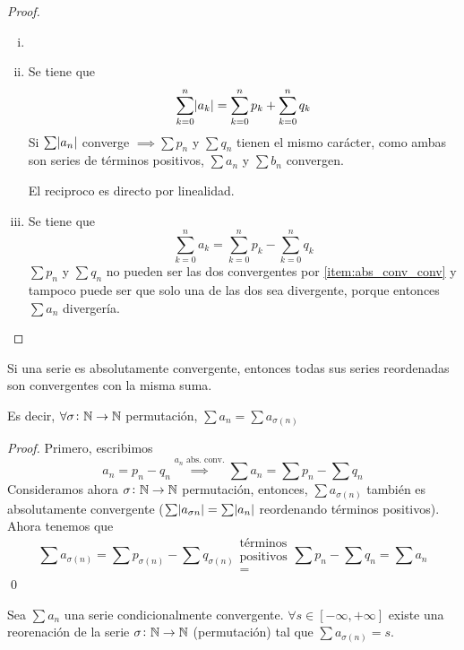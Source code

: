\begin{proof}
  \begin{enumerate}[i)]
  	\item[]
  	\item Se tiene que
			\[
				\sum\limits_{k=0}^ n \abs{a_k} = \sum\limits_{k=0}^ n p_k + \sum\limits_{k=0}^n q_k
    	\]
    	Si $\sum \abs{a_n}$ converge $\implies \sum p_n$ y $\sum q_n$ tienen el mismo carácter,
			como ambas son series de términos positivos, $\sum a_n$ y $\sum b_n$ convergen.

			El reciproco es directo por linealidad.
		\item Se tiene que
			\[
				\sum_{k=0}^n a_k = \sum_{k=0}^n p_k - \sum_{k=0}^n q_k
			\]
			$\sum p_n$ y $\sum q_n$ no pueden ser las dos convergentes por \ref{item:abs_conv_conv}
			y tampoco puede ser que solo una de las dos sea divergente, porque entonces
			$\sum a_n$ divergería.
  \end{enumerate}
\end{proof}

\begin{prop}
	Si una serie es absolutamente convergente, entonces todas sus series reordenadas
	son convergentes con la misma suma.

	Es decir, $\forall \sigma \colon \mathbb{N} \to \mathbb{N}$ permutación, $\sum a_n = \sum a_{\sigma(n)}$
\end{prop}

\begin{proof}
	Primero, escribimos
	\[
		a_n = p_n - q_n \stackrel{\text{$a_n$ abs. conv.}}{\implies}
		\sum a_n = \sum p_n - \sum q_n
	\]
	Consideramos ahora $\sigma \colon \mathbb{N} \to \mathbb{N}$ permutación, entonces, $\sum a_{\sigma(n)}$
	también es absolutamente convergente ($\sum \abs{a_{\sigma{n}}} = \sum \abs{a_n}$
	reordenando términos positivos). Ahora tenemos que
	\[
		\sum a_{\sigma(n)} = \sum p_{\sigma(n)} - \sum q_{\sigma(n)}
		\substack{\text{términos} \\ \text{positivos} \\ =} \sum p_n - \sum q_n = \sum a_n
	\]
	\qed
\end{proof}

\begin{thm}
	Sea $\sum a_n$ una serie condicionalmente convergente. $\forall s \in [-\infty,+\infty]$
	existe una reorenación de la serie $\sigma \colon \mathbb{N} \to \mathbb{N}$ (permutación) tal que
	$\sum a_{\sigma(n)} = s$.
\end{thm}

